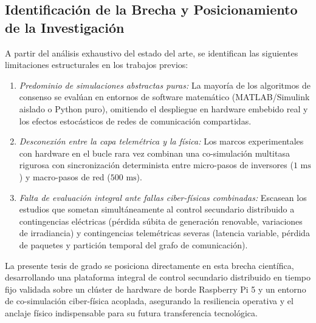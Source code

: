 \subsection{Identificación de la Brecha y Posicionamiento de la Investigación}
A partir del análisis exhaustivo del estado del arte, se identifican las siguientes limitaciones estructurales en los trabajos previos:
\begin{enumerate}[1.]
    \item \textit{Predominio de simulaciones abstractas puras:} La mayoría de los algoritmos de consenso se evalúan en entornos de software matemático (MATLAB/Simulink aislado o Python puro), omitiendo el despliegue en hardware embebido real y los efectos estocásticos de redes de comunicación compartidas.
    \item \textit{Desconexión entre la capa telemétrica y la física:} Los marcos experimentales con hardware en el bucle rara vez combinan una co-simulación multitasa rigurosa con sincronización determinista entre micro-pasos de inversores ($1\text{ ms}$) y macro-pasos de red ($500\text{ ms}$).
    \item \textit{Falta de evaluación integral ante fallas ciber-físicas combinadas:} Escasean los estudios que sometan simultáneamente al control secundario distribuido a contingencias eléctricas (pérdida súbita de generación renovable, variaciones de irradiancia) y contingencias telemétricas severas (latencia variable, pérdida de paquetes y partición temporal del grafo de comunicación).
\end{enumerate}

La presente tesis de grado se posiciona directamente en esta brecha científica, desarrollando una plataforma integral de control secundario distribuido en tiempo fijo validada sobre un clúster de hardware de borde Raspberry Pi 5 y un entorno de co-simulación ciber-física acoplada, asegurando la resiliencia operativa y el anclaje físico indispensable para su futura transferencia tecnológica.